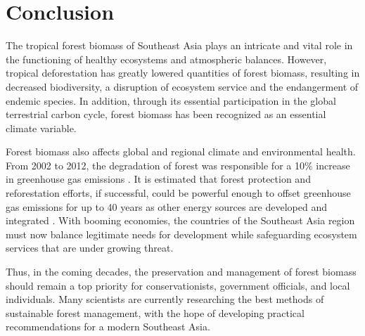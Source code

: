 \section{Conclusion}

The tropical forest biomass of Southeast Asia plays an intricate and vital role in the functioning of healthy ecosystems and atmospheric balances. However, tropical deforestation has greatly lowered quantities of forest biomass, resulting in decreased biodiversity, a disruption of ecosystem service and the endangerment of endemic species. In addition, through its essential participation in the global terrestrial carbon cycle, forest biomass has been recognized as an essential climate variable.

Forest biomass also affects global and regional climate and environmental health.  From 2002 to 2012, the degradation of forest was responsible for a 10\% increase in greenhouse gas emissions \citep{gullison2007tropical}. It is estimated that forest protection and reforestation efforts, if successful, could be powerful enough to offset greenhouse gas emissions for up to 40 years as other energy sources are developed and integrated \citep{lasco2002forest}. With booming economies, the countries of the Southeast Asia region must now balance legitimate needs for development while safeguarding ecosystem services that are under growing threat. 

Thus, in the coming decades, the preservation and management of forest biomass should remain a top priority for conservationists, government officials, and local individuals. Many scientists are currently researching the best methods of sustainable forest management, with the hope of developing practical recommendations for a modern Southeast Asia. 
